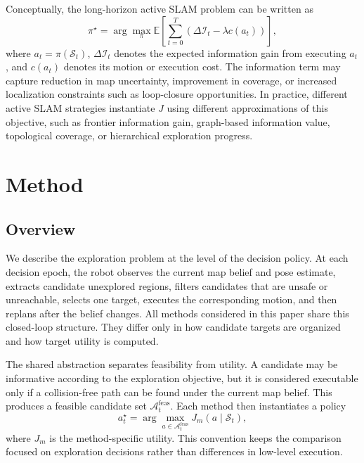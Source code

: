 \documentclass[conference]{IEEEtran}
\begin{document}
Conceptually, the long-horizon active SLAM problem can be written as
\begin{equation}
\pi^\star =
\arg\max_{\pi}
\mathbb{E}
\left[
\sum_{t=0}^{T}
\left(
\Delta\mathcal{I}_t
-
\lambda c(a_t)
\right)
\right],
\end{equation}
where $a_t=\pi(\mathcal{S}_t)$, $\Delta\mathcal{I}_t$ denotes the expected information gain from executing $a_t$, and $c(a_t)$ denotes its motion or execution cost. The information term may capture reduction in map uncertainty, improvement in coverage, or increased localization constraints such as loop-closure opportunities. In practice, different active SLAM strategies instantiate $J$ using different approximations of this objective, such as frontier information gain, graph-based information value, topological coverage, or hierarchical exploration progress.

\section{Method}

\subsection{Overview}

We describe the exploration problem at the level of the decision policy. At each decision epoch, the robot observes the current map belief and pose estimate, extracts candidate unexplored regions, filters candidates that are unsafe or unreachable, selects one target, executes the corresponding motion, and then replans after the belief changes. All methods considered in this paper share this closed-loop structure. They differ only in how candidate targets are organized and how target utility is computed.

The shared abstraction separates feasibility from utility. A candidate may be informative according to the exploration objective, but it is considered executable only if a collision-free path can be found under the current map belief. This produces a feasible candidate set $\mathcal{A}^{\mathrm{feas}}_t$. Each method then instantiates a policy
\begin{equation}
a_t^\star =
\arg\max_{a\in\mathcal{A}^{\mathrm{feas}}_t}
J_m(a\mid\mathcal{S}_t),
\end{equation}
where $J_m$ is the method-specific utility. This convention keeps the comparison focused on exploration decisions rather than differences in low-level execution.
\end{document}
